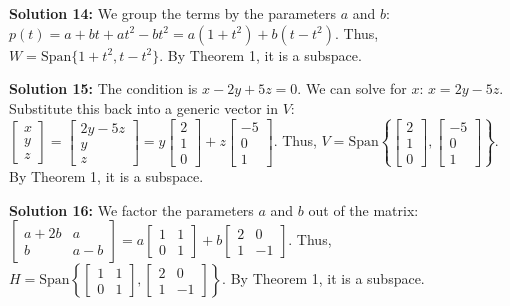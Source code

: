 \documentclass[11pt]{article}
\begin{document}
\vspace{0.3cm}
\textbf{Solution 14:}
We group the terms by the parameters $a$ and $b$:
$p(t) = a + bt + at^2 - bt^2 = a(1 + t^2) + b(t - t^2)$.
Thus, $W = \text{Span}\{ 1+t^2, t-t^2 \}$. By Theorem 1, it is a subspace.

\vspace{0.3cm}
\textbf{Solution 15:}
The condition is $x - 2y + 5z = 0$. We can solve for $x$: $x = 2y - 5z$.
Substitute this back into a generic vector in $V$:
$\begin{bmatrix} x \\ y \\ z \end{bmatrix} = \begin{bmatrix} 2y - 5z \\ y \\ z \end{bmatrix} = y\begin{bmatrix} 2 \\ 1 \\ 0 \end{bmatrix} + z\begin{bmatrix} -5 \\ 0 \\ 1 \end{bmatrix}$.
Thus, $V = \text{Span}\left\{ \begin{bmatrix} 2 \\ 1 \\ 0 \end{bmatrix}, \begin{bmatrix} -5 \\ 0 \\ 1 \end{bmatrix} \right\}$. By Theorem 1, it is a subspace.

\vspace{0.3cm}
\textbf{Solution 16:}
We factor the parameters $a$ and $b$ out of the matrix:
$\begin{bmatrix} a+2b & a \\ b & a-b \end{bmatrix} = a\begin{bmatrix} 1 & 1 \\ 0 & 1 \end{bmatrix} + b\begin{bmatrix} 2 & 0 \\ 1 & -1 \end{bmatrix}$.
Thus, $H = \text{Span}\left\{ \begin{bmatrix} 1 & 1 \\ 0 & 1 \end{bmatrix}, \begin{bmatrix} 2 & 0 \\ 1 & -1 \end{bmatrix} \right\}$. By Theorem 1, it is a subspace.
\end{document}
